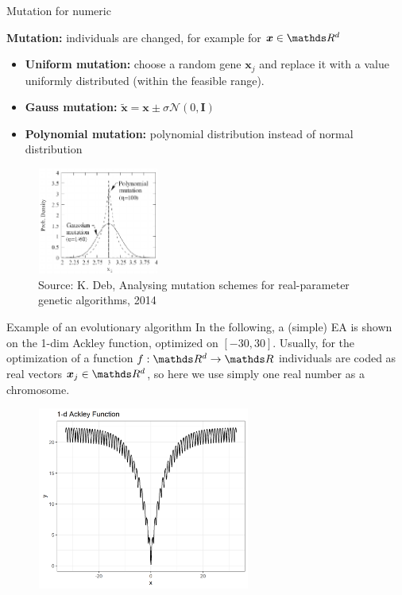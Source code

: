 \documentclass[11pt,compress,t,notes=noshow, xcolor=table]{beamer}
\begin{document}
\begin{vbframe}{Mutation for numeric}

\footnotesize
\textbf{Mutation:} individuals are changed, for example for $\bm{x} \in \R^d$
\begin{itemize}
\item \textbf{Uniform mutation:} choose a random gene $\bm{x}_j$ and replace it with a value uniformly distributed (within the feasible range).
\item \textbf{Gauss mutation:} $\bm{\tilde{x}} = \bm{x} \pm \sigma \mathcal{N}(0, \boldsymbol{I})$
\item \textbf{Polynomial mutation:} polynomial distribution instead of normal distribution
\end{itemize}
\begin{center}
\begin{figure}
  \includegraphics[height = 3.5cm, width = 4cm]{figure_man/polynomial_mutation.png}\\
  \scriptsize{Source: K. Deb, Analysing mutation schemes for real-parameter genetic algorithms, 2014}
\end{figure}
\end{center}

\end{vbframe}





\begin{vbframe}{Example of an evolutionary algorithm}
\footnotesize
In the following, a (simple) EA is shown on the 1-dim Ackley function, optimized on $[-30, 30]$. Usually, for the optimization of a function $f:\R^d \to \R$ individuals are coded as real vectors $\bm{x}_j \in \R^d$, so here we use simply one real number as a chromosome.

\begin{center}
\begin{figure}
  \includegraphics[height = 6cm, width = 7cm]{figure_man/1dim-ackley-func.png}
\end{figure}
\end{center}

\end{vbframe}
\end{document}
